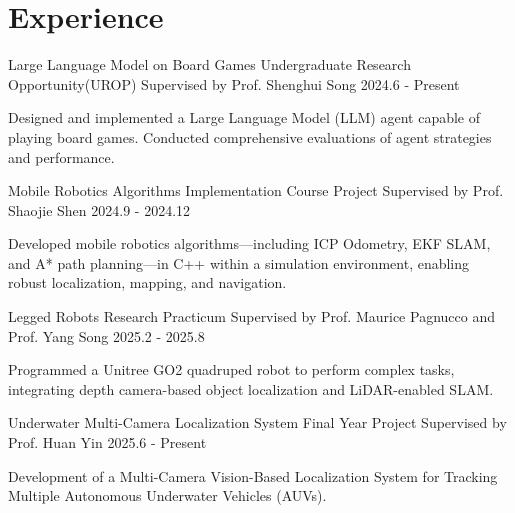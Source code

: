 \section{Experience}

\cventry
{Large Language Model on Board Games} %
{Undergraduate Research Opportunity(UROP)} %
{Supervised by Prof. Shenghui Song} %
{2024.6 - Present} %
\begin{cvitems}
\item {Designed and implemented a Large Language Model (LLM) agent capable of playing board games. Conducted comprehensive evaluations of agent strategies and performance.}
\end{cvitems}

\cventry
{Mobile Robotics Algorithms Implementation} %
{Course Project} %
{Supervised by Prof. Shaojie Shen} %
{2024.9 - 2024.12} %
\begin{cvitems}
\item {Developed mobile robotics algorithms—including ICP Odometry, EKF SLAM, and A* path planning—in C++ within a simulation environment, enabling robust localization, mapping, and navigation.}
\end{cvitems}

\cventry
{Legged Robots} %
{Research Practicum} %
{Supervised by Prof. Maurice Pagnucco and Prof. Yang Song} %
{2025.2 - 2025.8} %
\begin{cvitems}
\item {Programmed a Unitree GO2 quadruped robot to perform complex tasks, integrating depth camera-based object localization and LiDAR-enabled SLAM.}
\end{cvitems}

\cventry
{Underwater Multi-Camera Localization System} %
{Final Year Project} %
{Supervised by Prof. Huan Yin} %
{2025.6 - Present} %
\begin{cvitems}
\item {Development of a Multi-Camera Vision-Based Localization System for Tracking Multiple Autonomous Underwater Vehicles (AUVs).}
\end{cvitems}